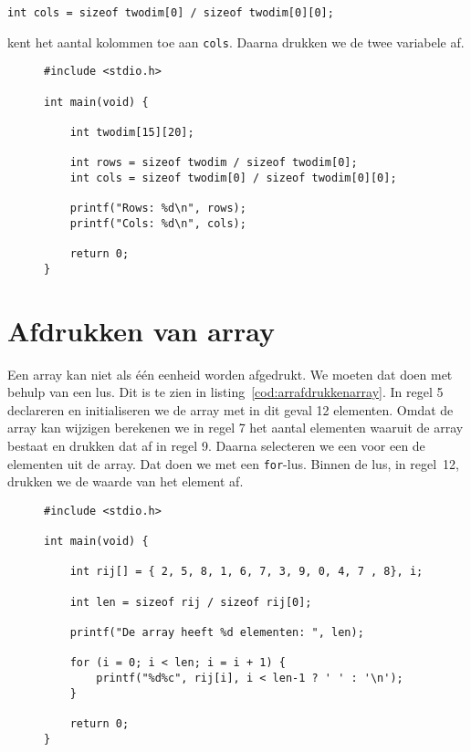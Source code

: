 \hspace*{1em}\texttt{int cols = sizeof twodim[0] / sizeof twodim[0][0];}

kent het aantal kolommen toe aan \texttt{cols}. Daarna drukken we de twee variabele af.

\begin{figure}[!ht]
\begin{lstlisting}[caption=Bepalen van het aantal rijen en kolommen.,label=cod:arrsizetwodim]
#include <stdio.h>

int main(void) {

	int twodim[15][20];

	int rows = sizeof twodim / sizeof twodim[0];
	int cols = sizeof twodim[0] / sizeof twodim[0][0];

	printf("Rows: %d\n", rows);
	printf("Cols: %d\n", cols);

	return 0;
}
\end{lstlisting}
\end{figure}
\section{Afdrukken van array}
Een array kan niet als één eenheid worden afgedrukt. We moeten dat doen met behulp van een lus. Dit is te zien in listing~\ref{cod:arrafdrukkenarray}. In regel 5 declareren en initialiseren we de array met in dit geval 12 elementen. Omdat de array kan wijzigen berekenen we in regel 7 het aantal elementen waaruit de array bestaat en drukken dat af in regel 9. Daarna selecteren we een voor een de elementen uit de array. Dat doen we met een \texttt{for}-lus. Binnen de lus, in regel~12, drukken we de waarde van het element af.

\begin{figure}[!ht]
\begin{lstlisting}[caption=Afdrukken van een array.,label=cod:arrafdrukkenarray]
#include <stdio.h>

int main(void) {

    int rij[] = { 2, 5, 8, 1, 6, 7, 3, 9, 0, 4, 7 , 8}, i;

    int len = sizeof rij / sizeof rij[0];

    printf("De array heeft %d elementen: ", len);

    for (i = 0; i < len; i = i + 1) {
        printf("%d%c", rij[i], i < len-1 ? ' ' : '\n');
    }

    return 0;
}
\end{lstlisting}
\end{figure}

